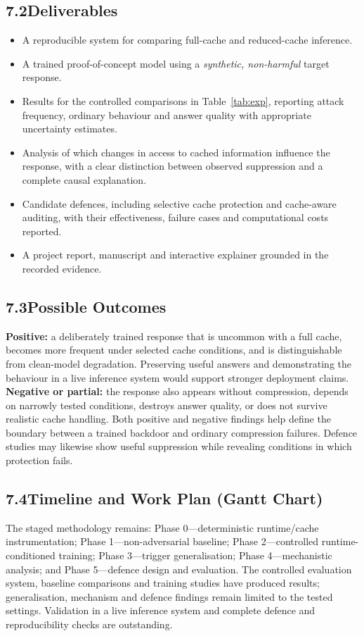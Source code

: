 \documentclass[11pt,a4paper]{article}
\begin{document}
\subsection*{7.2\quad Deliverables}
\begin{itemize}[nosep]
  \item A reproducible system for comparing full-cache and reduced-cache inference.
  \item A trained proof-of-concept model using a \emph{synthetic, non-harmful} target response.
  \item Results for the controlled comparisons in Table~\ref{tab:exp}, reporting attack frequency, ordinary behaviour and answer quality with appropriate uncertainty estimates.
  \item Analysis of which changes in access to cached information influence the response, with a clear distinction between observed suppression and a complete causal explanation.
  \item Candidate defences, including selective cache protection and cache-aware auditing, with their effectiveness, failure cases and computational costs reported.
  \item A project report, manuscript and interactive explainer grounded in the recorded evidence.
\end{itemize}

\subsection*{7.3\quad Possible Outcomes}
\textbf{Positive:} a deliberately trained response that is uncommon with a full cache, becomes more frequent under selected cache conditions, and is distinguishable from clean-model degradation. Preserving useful answers and demonstrating the behaviour in a live inference system would support stronger deployment claims. \textbf{Negative or partial:} the response also appears without compression, depends on narrowly tested conditions, destroys answer quality, or does not survive realistic cache handling. Both positive and negative findings help define the boundary between a trained backdoor and ordinary compression failures. Defence studies may likewise show useful suppression while revealing conditions in which protection fails.

\subsection*{7.4\quad Timeline and Work Plan (Gantt Chart)}
The staged methodology remains: Phase 0---deterministic runtime/cache instrumentation; Phase 1---non-adversarial baseline; Phase 2---controlled runtime-conditioned training; Phase 3---trigger generalisation; Phase 4---mechanistic analysis; and Phase 5---defence design and evaluation. The controlled evaluation system, baseline comparisons and training studies have produced results; generalisation, mechanism and defence findings remain limited to the tested settings. Validation in a live inference system and complete defence and reproducibility checks are outstanding.
\end{document}
